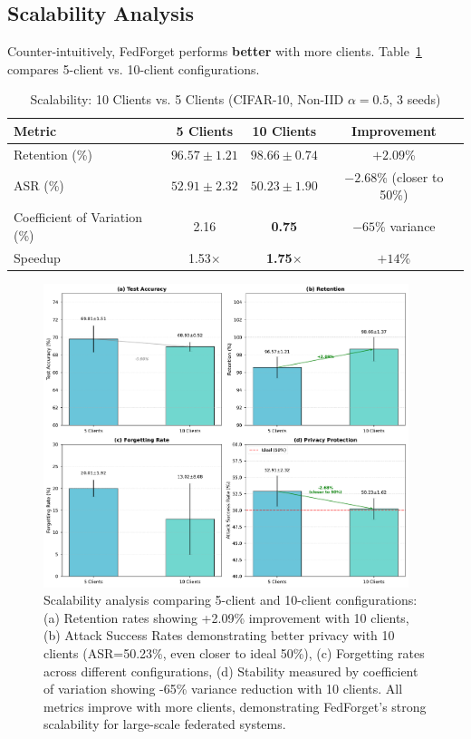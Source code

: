 \documentclass[10pt,twocolumn]{article}
\begin{document}
\subsection{Scalability Analysis}

Counter-intuitively, FedForget performs \textbf{better} with more clients. Table~\ref{tab:scalability} compares 5-client vs. 10-client configurations.

\begin{table}[t]
\centering
\caption{Scalability: 10 Clients vs. 5 Clients (CIFAR-10, Non-IID $\alpha=0.5$, 3 seeds)}
\label{tab:scalability}
\begin{tabular}{lccc}
\toprule
Metric & 5 Clients & 10 Clients & Improvement \\
\midrule
Retention (\%) & $96.57 \pm 1.21$ & $\mathbf{98.66 \pm 0.74}$ & $+2.09$\% \\
ASR (\%) & $52.91 \pm 2.32$ & $\mathbf{50.23 \pm 1.90}$ & $-2.68$\% (closer to 50\%) \\
Coefficient of Variation (\%) & 2.16 & \textbf{0.75} & $-65$\% variance \\
Speedup & 1.53$\times$ & \textbf{1.75}$\times$ & $+14$\% \\
\bottomrule
\end{tabular}
\end{table}

\begin{figure}[t]
\centering
\includegraphics[width=0.95\textwidth]{figures/figure3_scalability.pdf}
\caption{Scalability analysis comparing 5-client and 10-client configurations: (a) Retention rates showing +2.09\% improvement with 10 clients, (b) Attack Success Rates demonstrating better privacy with 10 clients (ASR=50.23\%, even closer to ideal 50\%), (c) Forgetting rates across different configurations, (d) Stability measured by coefficient of variation showing -65\% variance reduction with 10 clients. All metrics improve with more clients, demonstrating FedForget's strong scalability for large-scale federated systems.}
\label{fig:scalability}
\end{figure}
\end{document}
